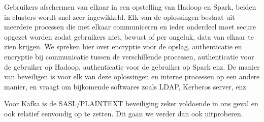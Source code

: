 \newline
\newline
Gebruikers afschermen van elkaar in een opstelling van Hadoop en Spark, beiden in clusters wordt snel zeer ingewikkeld. Elk van de oplossingen bestaat uit meerdere processen die met elkaar communiceren en ieder onderdeel moet secure opgezet worden zodat gebruikers niet, bewust of per ongeluk, data van elkaar te zien krijgen. We spreken hier over encryptie voor de opslag, authenticatie en encryptie bij communicatie tussen de verschillende processen, authenticatie voor de gebruiker op Hadoop, authenticatie voor de gebruiker op Spark enz.
De manier van beveiligen is voor elk van deze oplossingen en interne processen op een andere manier, en vraagt om bijkomende softwares zoals LDAP, Kerberos server, enz.

Voor Kafka is de SASL/PLAINTEXT beveiliging zeker voldoende in ons geval en ook relatief eenvoudig op te zetten. Dit gaan we verder dan ook uitproberen.

